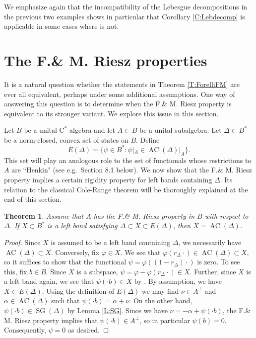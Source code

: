 \documentclass[10pt]{amsart}
\newcommand{\rC}{\mathrm{C}}
\renewcommand{\phi}{\varphi}
\newcommand{\AC}{\operatorname{AC}}
\newcommand{\SG}{\operatorname{SG}}
\newtheorem{theorem}[lemma]{Theorem}
\theoremstyle{definition}
\begin{document}
We emphasize again that the incompatibility of the Lebesgue decompositions in the previous two examples shows in particular that Corollary \ref{C:Lebdecomp} is applicable in some cases where \cite[Theorem 2.4]{CH2025} is not.


\section{The F.\& M. Riesz properties}\label{S:FM}
It is a natural question whether the statements in Theorem \ref{T:ForelliFM} are ever all equivalent, perhaps under some additional assumptions. One way of answering this question is to determine when the F.\& M. Riesz property is equivalent to its stronger variant. We explore this issue in this section.


Let $B$ be a unital $\rC^*$-algebra and let $A\subset B$ be a unital subalgebra. 
Let $\Delta\subset B^*$ be a norm-closed, convex set of states on $B$.  Define
\[
E(\Delta)=\{\psi\in B^*:\psi|_A\in  \AC(\Delta)|_A\}.
\]
This set will play an analogous role to the set of functionals whose restrictions to $A$ are ``Henkin" (see e.g.\ Section 8.1 below).
We now show that the F.\& M. Riesz property implies a certain rigidity property for left bands containing $\Delta$.  
 Its relation to the 
 classical Cole-Range theorem \cite[Theorem 9.6.1]{rudin2008} will be thoroughly 
explained at the end of this section. 



\begin{theorem}\label{T:colerange}
Assume that $A$ has the F.\& M. Riesz property in $B$ with respect to $\Delta$. If $X\subset B^*$ is a left band satisfying $\Delta\subset X\subset E(\Delta)$, then $X=\AC(\Delta)$.
\end{theorem} 
 \begin{proof}
 Since $X$ is assumed to be a left band containing $\Delta$, we necessarily have $\AC(\Delta)\subset X$. Conversely, fix $\phi\in X$. We see that $\phi( r_\Delta \cdot)\in \AC(\Delta)\subset X$, so it suffices to show that the functional $\psi=\phi( (1-r_\Delta)\cdot)$ is zero. To see this, fix $b\in B$. Since $X$  is a subspace, $\psi=\phi-\phi( r_\Delta \cdot)\in X$. Further, since $X$ is a left band again, we see that $\psi( \cdot b)\in X$ by
 \cite[Lemma  2.7]{CT2023Henkin}. By assumption, we have $X\subset E(\Delta)$.  Using the definition of $E(\Delta)$ we may  find 
 $\nu\in A^\perp$ and $\alpha\in \AC(\Delta)$ such that $\psi( \cdot b )=\alpha+\nu$. On the other hand, $\psi(\cdot b)\in \SG(\Delta)$ by Lemma \ref{L:SG}. Since we have $\nu=-\alpha+\psi(\cdot b)$, the F.\& M. Riesz property implies 
 that $\psi(\cdot b)\in A^{\perp}$, so in particular $\psi(b)=0$. Consequently, $\psi=0$ as desired.
 \end{proof}
 
\end{document}
